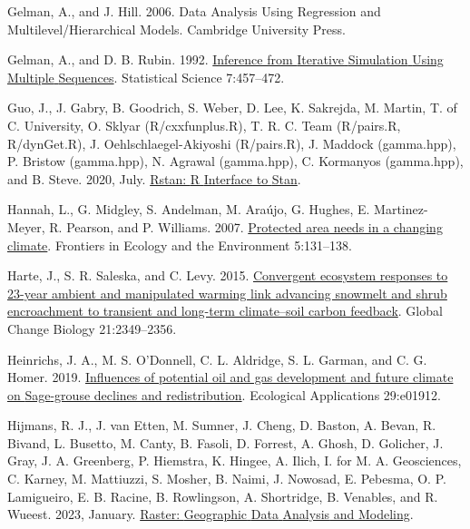 \documentclass[
  12pt,
]{article}
\newlength{\cslhangindent}
\newlength{\cslentryspacingunit} %
\newenvironment{CSLReferences}[2] %
 {%
  \setlength{\parindent}{0pt}
  \ifodd #1
  \let\oldpar\par
  \def\par{\hangindent=\cslhangindent\oldpar}
  \fi
  \setlength{\parskip}{#2\cslentryspacingunit}
 }%
 {}
\begin{document}
\begin{CSLReferences}{1}{0}
\leavevmode{}%
Gelman, A., and J. Hill. 2006. Data {Analysis} {Using} {Regression} and {Multilevel}/{Hierarchical} {Models}. Cambridge University Press.

\leavevmode{}%
Gelman, A., and D. B. Rubin. 1992. \href{https://doi.org/10.1214/ss/1177011136}{Inference from {Iterative} {Simulation} {Using} {Multiple} {Sequences}}. Statistical Science 7:457--472.

\leavevmode{}%
Guo, J., J. Gabry, B. Goodrich, S. Weber, D. Lee, K. Sakrejda, M. Martin, T. of C. University, O. Sklyar (R/cxxfunplus.R), T. R. C. Team (R/pairs.R, R/dynGet.R), J. Oehlschlaegel-Akiyoshi (R/pairs.R), J. Maddock (gamma.hpp), P. Bristow (gamma.hpp), N. Agrawal (gamma.hpp), C. Kormanyos (gamma.hpp), and B. Steve. 2020, July. \href{https://CRAN.R-project.org/package=rstan}{Rstan: {R} {Interface} to {Stan}}.

\leavevmode{}%
Hannah, L., G. Midgley, S. Andelman, M. Araújo, G. Hughes, E. Martinez-Meyer, R. Pearson, and P. Williams. 2007. \href{https://doi.org/10.1890/1540-9295(2007)5\%5B131:PANIAC\%5D2.0.CO;2}{Protected area needs in a changing climate}. Frontiers in Ecology and the Environment 5:131--138.

\leavevmode{}%
Harte, J., S. R. Saleska, and C. Levy. 2015. \href{https://doi.org/10.1111/gcb.12831}{Convergent ecosystem responses to 23-year ambient and manipulated warming link advancing snowmelt and shrub encroachment to transient and long-term climate--soil carbon feedback}. Global Change Biology 21:2349--2356.

\leavevmode{}%
Heinrichs, J. A., M. S. O'Donnell, C. L. Aldridge, S. L. Garman, and C. G. Homer. 2019. \href{https://doi.org/10.1002/eap.1912}{Influences of potential oil and gas development and future climate on {Sage}-grouse declines and redistribution}. Ecological Applications 29:e01912.

\leavevmode{}%
Hijmans, R. J., J. van Etten, M. Sumner, J. Cheng, D. Baston, A. Bevan, R. Bivand, L. Busetto, M. Canty, B. Fasoli, D. Forrest, A. Ghosh, D. Golicher, J. Gray, J. A. Greenberg, P. Hiemstra, K. Hingee, A. Ilich, I. for M. A. Geosciences, C. Karney, M. Mattiuzzi, S. Mosher, B. Naimi, J. Nowosad, E. Pebesma, O. P. Lamigueiro, E. B. Racine, B. Rowlingson, A. Shortridge, B. Venables, and R. Wueest. 2023, January. \href{https://CRAN.R-project.org/package=raster}{Raster: {Geographic} {Data} {Analysis} and {Modeling}}.


\end{CSLReferences}
\end{document}
